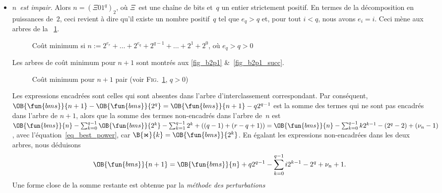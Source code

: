 \begin{itemize}
  \item \emph{\(n\)~est impair}. Alors \(n = (\Xi 01^q)_2\), où
  \(\Xi\)~est une chaîne de bits et~\(q\) un entier strictement
  positif. En termes de la décomposition en puissances de~\(2\), ceci
  revient à dire qu'il existe un nombre positif~\(q\) tel que
  \(e_q>q\) et, pour tout \(i < q\), nous avons \(e_i=i\). Ceci
  mène aux arbres de la \fig~\ref{fig_B2p1}.
\begin{figure}[t]
\centering
{}
\qquad
{}
\caption{Coût minimum si \(n:=2^{e_r} + \dots + 2^{e_q} + 2^{q-1} +
  \dots + 2^1 + 2^0\), où \(e_q > q > 0\)
\label{fig_B2p1}}
\end{figure}
Les arbres de coût minimum pour \(n+1\) sont montrés aux \figs{}
\ref{fig_b2p1} \&~\ref{fig_b2p1_succ}.
\begin{figure}
\centering
{}
\qquad
{}
\caption{Coût minimum pour \(n+1\) pair
(voir \textsc{Fig}.~\ref{fig_B2p1}, \(q>0\))}
\end{figure}
Les expressions encadrées sont celles qui sont absentes dans l'arbre
d'interclassement correspondant. Par conséquent,
\(\OB{\fun{bms}}{n+1} -
\OB{\fun{bms}}{2^q} = \OB{\fun{bms}}{n+1} - q2^{q-1}\) est la somme
des termes qui ne sont pas encadrés dans l'arbre de \(n+1\), alors que
la somme des termes non-encadrés dans l'arbre de~\(n\) est
\(\OB{\fun{bms}}{n} - \sum_{k=0}^{q-1}\OB{\fun{bms}}{2^k} -
\sum_{k=1}^{q-1}2^k + ((q-1)+(r-q+1)) = \OB{\fun{bms}}{n} -
\sum_{k=0}^{q-1}{k2^{k-1}} - (2^q - 2) + (\nu_n - 1)\), avec
l'équation~\eqref{eq_best_power}, car \(\B{\Join}{k} =
\OB{\fun{bms}}{2^k}\). En égalant les expressions non-encadrées dans
les deux arbres, nous déduisons
\begin{equation}
\abovedisplayskip=4pt
\belowdisplayskip=4pt
\OB{\fun{bms}}{n+1} = \OB{\fun{bms}}{n} + q2^{q-1} -
\sum_{k=0}^{q-1}{i2^{k-1}} - 2^q + \nu_n + 1.
\label{eq_B1}
\end{equation}
Une forme close de la somme restante est obtenue par la \emph{méthode
  des perturbations}

\end{itemize}
